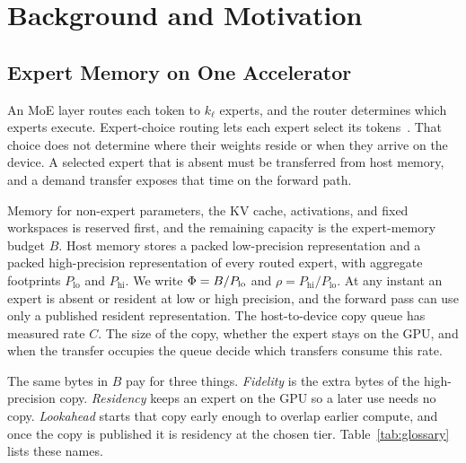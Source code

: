 \section{Background and Motivation}
\label{sec:bg}

\subsection{Expert Memory on One Accelerator}
\label{sec:serving}

An MoE layer routes each token to \(k_{\ell}\) experts, and the router determines which experts execute.
Expert-choice routing lets each expert select its tokens~\cite{zhou2022expertchoice}.
That choice does not determine where their weights reside or when they arrive on the device.
A selected expert that is absent must be transferred from host memory, and a demand transfer exposes that time on the forward path.

Memory for non-expert parameters, the KV cache, activations, and fixed workspaces is reserved first, and the remaining capacity is the expert-memory budget \(B\).
Host memory stores a packed low-precision representation and a packed high-precision representation of every routed expert, with aggregate footprints \(P_{\mathrm{lo}}\) and \(P_{\mathrm{hi}}\).
We write \(\Phi=B/P_{\mathrm{lo}}\) and \(\rho=P_{\mathrm{hi}}/P_{\mathrm{lo}}\).
At any instant an expert is absent or resident at low or high precision, and the forward pass can use only a published resident representation.
The host-to-device copy queue has measured rate \(C\).
The size of the copy, whether the expert stays on the GPU, and when the transfer occupies the queue decide which transfers consume this rate.

The same bytes in \(B\) pay for three things.
\emph{Fidelity} is the extra bytes of the high-precision copy.
\emph{Residency} keeps an expert on the GPU so a later use needs no copy.
\emph{Lookahead} starts that copy early enough to overlap earlier compute, and once the copy is published it is residency at the chosen tier.
Table~\ref{tab:glossary} lists these names.

